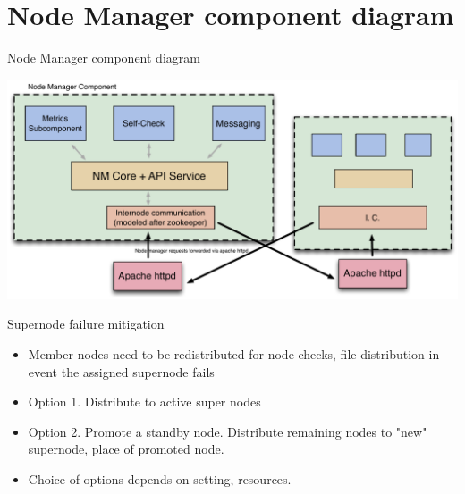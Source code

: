 \documentclass{beamer}
\begin{document}
%
%
%



\section{Node Manager component diagram}
\begin{frame}{Node Manager component diagram}
\begin{center}
\includegraphics[scale=0.45]{NM-design-v2.pdf}
\end{center}
\end{frame}

\begin{frame}{Supernode failure mitigation}

\begin{itemize}
\item
Member nodes need to be redistributed for node-checks, file distribution in event the assigned supernode fails

\item
Option 1.  Distribute to active super nodes
\item
Option 2. Promote a standby node.  Distribute remaining nodes to "new" supernode, place of promoted node.
\item
Choice of options depends on setting, resources.  
\end{itemize}



\end{frame}
\end{document}
